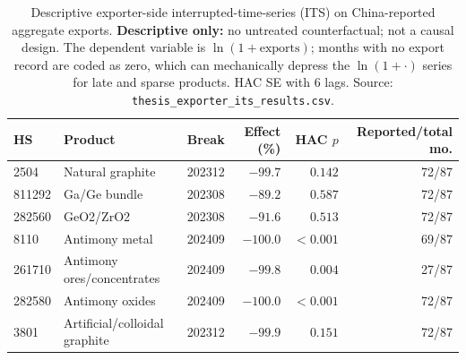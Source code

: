 \begin{table}[H]
\centering
\caption{Descriptive exporter-side interrupted-time-series (ITS) on
China-reported aggregate exports. \textbf{Descriptive only:} no
untreated counterfactual; not a causal design. The dependent variable
is $\ln(1+\text{exports})$; months with no export record are coded as
zero, which can mechanically depress the $\ln(1+\cdot)$ series for
late and sparse products. HAC SE with 6 lags. Source:
\texttt{thesis\_exporter\_its\_results.csv}.}
\label{tab:exporter_its}
\footnotesize
\begin{tabular}{llrrrr}
\toprule
HS & Product & Break & Effect (\%) & HAC $p$ & Reported/total mo.\\
\midrule
2504 & Natural graphite & 202312 & $-99.7$ & $0.142$ & 72/87 \\
811292 & Ga/Ge bundle & 202308 & $-89.2$ & $0.587$ & 72/87 \\
282560 & GeO2/ZrO2 & 202308 & $-91.6$ & $0.513$ & 72/87 \\
8110 & Antimony metal & 202409 & $-100.0$ & $<0.001$ & 69/87 \\
261710 & Antimony ores/concentrates & 202409 & $-99.8$ & $0.004$ & 27/87 \\
282580 & Antimony oxides & 202409 & $-100.0$ & $<0.001$ & 72/87 \\
3801 & Artificial/colloidal graphite & 202312 & $-99.9$ & $0.151$ & 72/87 \\
\bottomrule
\end{tabular}
\end{table}
